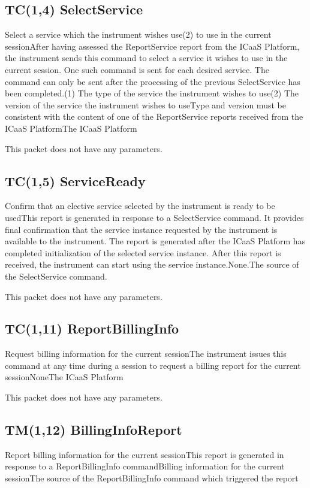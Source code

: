 \pagebreak
\subsection{TC(1,4) SelectService}
Select a service which the instrument wishes use\newline (2) to use in the current sessionAfter having assessed the ReportService report from the ICaaS Platform, the instrument sends this command to select a service it wishes to use in the current session. One such command is sent for each desired service. The command can only be sent after the processing of the previous SelectService has been completed.(1) The type of the service the instrument wishes to use\newline (2) The version of the service the instrument wishes to use\newline \newline Type and version must be consistent with the content of one of the ReportService reports received from the ICaaS PlatformThe ICaaS Platform

This packet does not have any parameters.

\pagebreak
\subsection{TC(1,5) ServiceReady}
Confirm that an elective service selected by the instrument is ready to be usedThis report is generated in response to a SelectService command. It provides final confirmation that the service instance requested by the instrument is available to the instrument. The report is generated after the ICaaS Platform has completed initialization of the selected service instance. After this report is received, the instrument can start using the service instance.None.The source of the SelectService command.

This packet does not have any parameters.

\pagebreak
\subsection{TC(1,11) ReportBillingInfo}
Request billing information for the current sessionThe instrument issues this command at any time during a session to request a billing report for the current sessionNoneThe ICaaS Platform

This packet does not have any parameters.

\pagebreak
\subsection{TM(1,12) BillingInfoReport}
Report billing information for the current sessionThis report is generated in response to a ReportBillingInfo commandBilling information for the current sessionThe source of the ReportBillingInfo command which triggered the report

